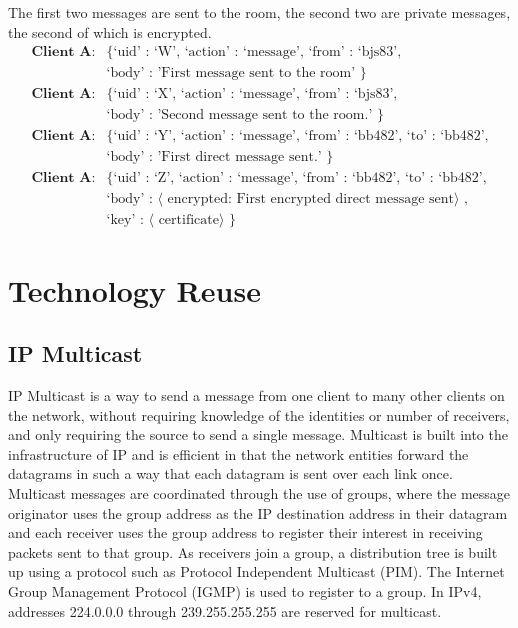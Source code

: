 \documentclass{article}
\begin{document}
The first two messages are sent to the room, the second two are private
messages, the second of which is encrypted.
\begin{align*}
\textbf{Client A}:& \text{\{ `uid' : `W', `action' : `message', `from' :
`bjs83',}\\
&\text{`body' : 'First message sent to the room' \}}\\
\textbf{Client A}:& \text{\{ `uid' : `X', `action' : `message', `from' :
`bjs83',}\\
&\text{`body' : 'Second message sent to the room.' \}}\\
\textbf{Client A}:& \text{\{ `uid' : `Y', `action' : `message', `from' : `bb482',
`to' : `bb482',}\\
&\text{`body' : 'First direct message sent.' \}}\\
\textbf{Client A}:& \text{\{ `uid' : `Z', `action' : `message', `from' : `bb482',
`to' : `bb482',}\\
&\text{`body' : $\langle$ encrypted: First encrypted direct message
sent$\rangle$ ,} \\
&\text{`key' : $\langle$ certificate$\rangle$ \}}
\end{align*}

\section{Technology Reuse}

\subsection{IP Multicast}

IP Multicast is a way to send a message from one client to many other clients on
the network, without requiring knowledge of the identities or number of
receivers, and only requiring the source to send a single message. Multicast is
built into the infrastructure of IP and is efficient in that the network
entities forward the datagrams in such a way that each datagram is sent over
each link once. Multicast messages are coordinated through the use of groups,
where the message originator uses the group address as the IP destination
address in their datagram and each receiver uses the group address to register
their interest in receiving packets sent to that group. As receivers join a
group, a distribution tree is built up using a protocol such as Protocol
Independent Multicast (PIM). The Internet Group Management Protocol (IGMP) is
used to register to a group. In IPv4, addresses 224.0.0.0 through
239.255.255.255 are reserved for multicast.
\end{document}
